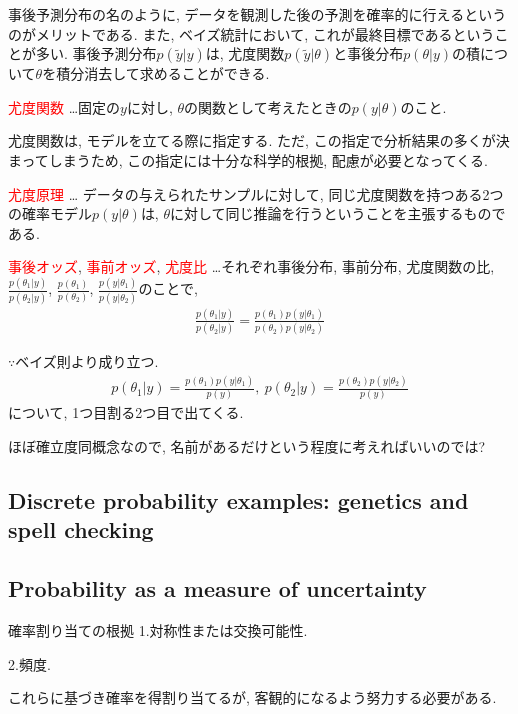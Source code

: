 \documentclass[11pt,a4pape,dvipdfmx]{jarticle}
\newcommand{\eqn}[1]{\begin{align*}#1\end{align*}}
\newcommand{\tcr}[1]{\textcolor{red}{#1}}
\begin{document}
事後予測分布の名のように, データを観測した後の予測を確率的に行えるというのがメリットである.
また, ベイズ統計において, これが最終目標であるということが多い.
事後予測分布$p(\tilde{y}|y)$は, 尤度関数$p(\tilde{y}|\theta)$と事後分布$p(\theta|y)$の積について$\theta$を積分消去して求めることができる.


\begin{itembox}[l]{\tcr{尤度関数}}
…固定の$y$に対し, $\theta$の関数として考えたときの$p(y|\theta)$のこと.
\end{itembox}

尤度関数は, モデルを立てる際に指定する.
ただ, この指定で分析結果の多くが決まってしまうため, この指定には十分な科学的根拠, 配慮が必要となってくる.


\begin{itembox}[l]{\tcr{尤度原理}}
… データの与えられたサンプルに対して, 同じ尤度関数を持つある2つの確率モデル$p(y|\theta)$は, $\theta$に対して同じ推論を行うということを主張するものである.
\end{itembox}


\begin{itembox}[l]{\tcr{事後オッズ}, \tcr{事前オッズ}, \tcr{尤度比}}
…それぞれ事後分布, 事前分布, 尤度関数の比, $\tfrac{p(\theta_1|y)}{p(\theta_2|y)}$, $\tfrac{p(\theta_1)}{p(\theta_2)}$, $\tfrac{p(y|\theta_1)}{p(y|\theta_2)}$のことで,
\eqn{\tfrac{p(\theta_1|y)}{p(\theta_2|y)}=\tfrac{p(\theta_1)p(y|\theta_1)}{p(\theta_2)p(y|\theta_2)}}
\end{itembox}
$\because$ベイズ則より成り立つ.
\eqn{p(\theta_1|y)=\tfrac{p(\theta_1)p(y|\theta_1)}{p(y)},\ p(\theta_2|y)=\tfrac{p(\theta_2)p(y|\theta_2)}{p(y)}}
について, 1つ目割る2つ目で出てくる.

ほぼ確立度同概念なので, 名前があるだけという程度に考えればいいのでは?

\subsection{Discrete probability examples: genetics and spell checking}


\subsection{Probability as a measure of uncertainty}
\begin{itembox}[l]{確率割り当ての根拠}
1.対称性または交換可能性.

2.頻度.

これらに基づき確率を得割り当てるが, 客観的になるよう努力する必要がある.
\end{itembox}
\end{document}
